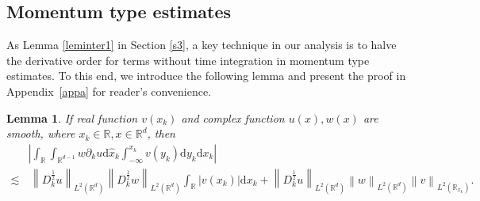 \documentclass[10pt,twoside,a4paper]{article}
\newtheorem{lem}[thm]{Lemma}
\numberwithin{equation}{section}\allowdisplaybreaks
\begin{document}
\subsection{Momentum type estimates} \label{s4.1}


As Lemma \ref{leminter1} in Section \ref{s3}, a key technique in our analysis is to halve the derivative order for terms without time integration in momentum type estimates. To this end, we introduce the following lemma and present the proof  in Appendix~\ref{appa} for reader's convenience. 
\begin{lem} \label{lemhalve}
	If real function $ v(x_k) $ and complex function  $ u(x), w(x) $ are smooth, where $ x_k \in \mathbb{R}, x\in \mathbb{R}^d $,  then 
	\begin{align}  \label{lemhalve1}
		&\left|\int_{\mathbb{R}}  \int_{\mathbb{R}^{d-1}} w \partial_k u  \mathrm{d} \hat{x}_k \int_{-\infty}^{x_k} v(y_k) \mathrm{d} y_k  \mathrm{d} x_k\right|\\
		\lesssim &\, \left\|   D_k^{\frac 12}u\right\|_{L^2(\mathbb{R}^d)}\left\|   D_k^{\frac 12}w\right\|_{L^2(\mathbb{R}^d)} \int_{ \mathbb{R}} |v(x_k) |\mathrm{d} x_k +  \left\|   D_k^{\frac 12}u\right\|_{L^2(\mathbb{R}^d)} \left\|   w\right\|_{L^2(\mathbb{R}^d)} \left\| v \right\|_{L^2(\mathbb{R}_{x_k})}.\nonumber
	\end{align}
\end{lem}
\end{document}
